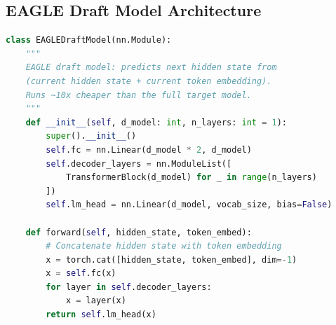 \documentclass[11pt,a4paper]{article}
\begin{document}
\subsection{EAGLE Draft Model Architecture}

\begin{lstlisting}[language=Python, caption={EAGLE Draft Model: Predicts Next Hidden State}]
class EAGLEDraftModel(nn.Module):
    """
    EAGLE draft model: predicts next hidden state from 
    (current hidden state + current token embedding).
    Runs ~10x cheaper than the full target model.
    """
    def __init__(self, d_model: int, n_layers: int = 1):
        super().__init__()
        self.fc = nn.Linear(d_model * 2, d_model)
        self.decoder_layers = nn.ModuleList([
            TransformerBlock(d_model) for _ in range(n_layers)
        ])
        self.lm_head = nn.Linear(d_model, vocab_size, bias=False)
    
    def forward(self, hidden_state, token_embed):
        # Concatenate hidden state with token embedding
        x = torch.cat([hidden_state, token_embed], dim=-1)
        x = self.fc(x)
        for layer in self.decoder_layers:
            x = layer(x)
        return self.lm_head(x)
\end{lstlisting}
\end{document}
